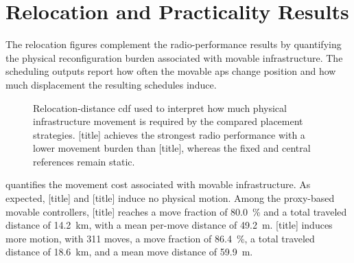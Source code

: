 \section{Relocation and Practicality Results}
\label{sec:results_relocation}

The relocation figures complement the radio-performance results by quantifying the physical reconfiguration burden associated with movable infrastructure. The scheduling outputs report how often the movable \glspl{ap} change position and how much displacement the resulting schedules induce.

\begin{figure}[t]
        \centering
        \begingroup
        \def\postprocessfigurewidth{\linewidth}
        
        \endgroup
    \caption{Relocation-distance \gls{cdf} used to interpret how much physical infrastructure movement is required by the compared placement strategies. [title] achieves the strongest radio performance with a lower movement burden than [title], whereas the fixed and central references remain static.}
    \label{fig:schedule_pair}
\end{figure}

 quantifies the movement cost associated with movable infrastructure. As expected, [title] and [title] induce no physical motion. Among the proxy-based movable controllers, [title] reaches a move fraction of \SI{80.0}{\percent} and a total traveled distance of \SI{14.2}{km}, with a mean per-move distance of \SI{49.2}{m}. [title] induces more motion, with \num{311} moves, a move fraction of \SI{86.4}{\percent}, a total traveled distance of \SI{18.6}{km}, and a mean move distance of \SI{59.9}{m}.


